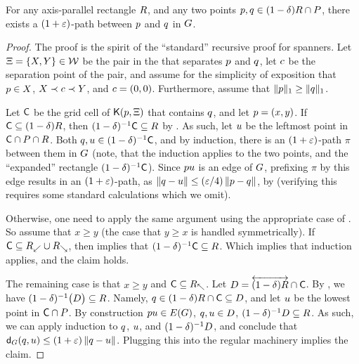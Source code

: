 \documentclass[12pt]{article}%
\begin{document}
\begin{lemma}
    For any axis-parallel rectangle $R$, and any two points
    $p, q \in (1-\delta)R \cap P$, there exists a
    $(1+\varepsilon)$-path between $p$ and $q$ in $G$.
\end{lemma}
\begin{proof}
    The proof is the spirit of the ``standard'' recursive proof for
    spanners. Let $\Xi = \{ X, Y \} \in \mathcal{W}$ be the pair in
    the \QSPD that separates $p$ and $q$, let $c$ be the
    separation point of the pair, and assume for the simplicity of
    exposition that $p \in X$, $X \prec c \prec Y$, and
    $c = (0,0)$. Furthermore, assume that
    $\|p\|_1 \geq \|q\|_1$.

    Let $\mathsf{C}$ be the grid cell of $\mathsf{K}(p, \Xi)$ that contains
    $q$, and let $p = (x,y)$. If
    $\mathsf{C} \subseteq (1-\delta)R$, then
    $(1-\delta)^{-1}\mathsf{C} \subseteq R$ by 
    . As such, let $u$ be the leftmost point in
    $\mathsf{C} \cap P \cap R$. Both
    $q, u \in (1-\delta)^{-1}\mathsf{C}$, and by induction, there is an
    $(1+\varepsilon)$-path $\pi$ between them in $G$ (note, that the
    induction applies to the two points, and the ``expanded''
    rectangle $(1-\delta)^{-1}\mathsf{C}$). Since $p u$ is an edge of
    $G$, prefixing $\pi$ by this edge results in an $(1+\varepsilon)$-path,
    as $\left\| q - u \right\| \leq (\varepsilon/4) \left\| p - q \right\|$, by 
     (verifying this requires some standard
    calculations which we omit).

    Otherwise, one need to apply the same argument using the
    appropriate case of .  So assume that $x \geq y$
    (the case that $y \geq x$ is handled symmetrically). If
    $\mathsf{C} \subseteq R_\swarrow \cup R_\searrow$, then
     implies that
    $(1-\delta)^{-1} \mathsf{C} \subseteq R$. Which implies that
    induction applies, and the claim holds.

    The remaining case is that $x \geq y$ and
    $\mathsf{C} \subseteq R_\nwarrow$.  Let
    $D= \overleftrightarrow{ (1-\delta)R} \cap \mathsf{C}$.  By ,
    we have $(1-\delta)^{-1} \bigl(D \bigr) \subseteq
    R$. Namely,
    $q \in (1-\delta)R \cap \mathsf{C} \subseteq D$, and let
    $u$ be the lowest point in $\mathsf{C} \cap P$. By construction
    $\pa \pc \in \EGX{\G}$, $q, u \in D$,
    $(1-\delta)^{-1} D \subseteq R$. As such, we can apply
    induction to $q$, $u$, and $(1-\delta)^{-1} D$, and
    conclude that $\dGZ{\G}{\pb}{\pc} \leq (1+\eps) \dY{\pb}{\pc}$.
    Plugging this into the regular machinery implies the claim.
\end{proof}
\end{document}
